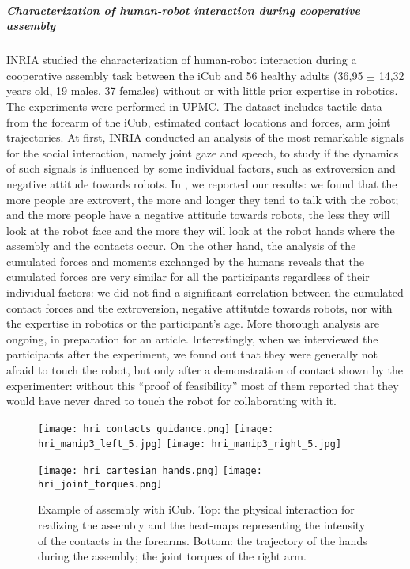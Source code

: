 \subparagraph*{Characterization of human-robot interaction during cooperative assembly}

INRIA studied the characterization of human-robot interaction during a cooperative assembly task between the iCub and 56 healthy adults (36,95 $\pm$ 14,32 years old, 19 males, 37 females) without or with little prior expertise in robotics. The experiments were performed in UPMC. The dataset includes tactile data from the forearm of the iCub, estimated contact locations and forces, arm joint trajectories. 
At first, INRIA conducted an analysis of the most remarkable signals for the social interaction, namely joint gaze and speech, to study if the dynamics of such signals is influenced by some individual factors, such as extroversion and negative attitude towards robots. In \cite{ivaldi2015towards}, we reported our results: we found that the more people are extrovert, the more and longer they tend to talk with the robot; and the more people have a negative attitude towards robots, the less they will look at the robot face and the more they will look at
the robot hands where the assembly and the contacts occur. On the other hand, the analysis of the cumulated forces and moments exchanged by the humans reveals that the cumulated forces are very similar for all the participants regardless of their individual factors: we did not find a significant correlation between the cumulated contact forces and the extroversion, negative attitutde towards robots, nor with the expertise in robotics or the participant's age. More thorough analysis are ongoing, in preparation for an article.
Interestingly, when we interviewed the participants after the experiment, we found out that they were generally not afraid to touch the robot, but only after a demonstration of contact shown by the experimenter: without this ``proof of feasibility'' most of them reported that they would have never dared to touch the robot for collaborating with it.

\begin{figure}
	\begin{center}
	\texttt{[image: hri\_contacts\_guidance.png]}
	\texttt{[image: hri\_manip3\_left\_5.jpg]}
	\texttt{[image: hri\_manip3\_right\_5.jpg]}
	
	\texttt{[image: hri\_cartesian\_hands.png]}
	\texttt{[image: hri\_joint\_torques.png]}
	\end{center}
	\caption{Example of assembly with iCub. Top: the physical interaction for realizing the assembly and the heat-maps representing the intensity of the contacts in the forearms. Bottom: the trajectory of the hands during the assembly; the joint torques of the right arm. }
	\label{fig:HRI}
\end{figure}

